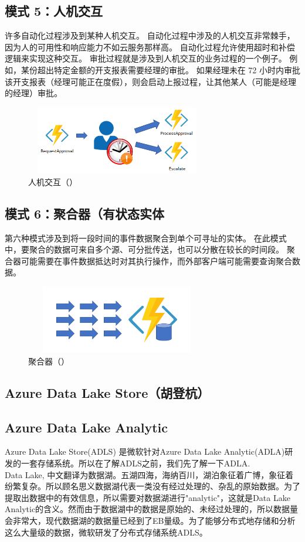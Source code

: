 \documentclass[11pt]{article}
\begin{document}
\subsection{模式 5：人机交互}
许多自动化过程涉及到某种人机交互。 自动化过程中涉及的人机交互非常棘手，因为人的可用性和响应能力不如云服务那样高。 自动化过程允许使用超时和补偿逻辑来实现这种交互。
审批过程就是涉及到人机交互的业务过程的一个例子。 例如，某份超出特定金额的开支报表需要经理的审批。 如果经理未在 72 小时内审批该开支报表（经理可能正在度假），则会启动上报过程，让其他某人（可能是经理的经理）审批。
\begin{figure}[H]
\begin{flushleft}
\includegraphics[width=8cm, height=3cm]{figs/model5}
\caption{人机交互（\cite{Durable}）}
\end{flushleft}
\end{figure}

\subsection{模式 6：聚合器（有状态实体}
第六种模式涉及到将一段时间的事件数据聚合到单个可寻址的实体。 在此模式中，要聚合的数据可来自多个源、可分批传送，也可以分散在较长的时间段。 聚合器可能需要在事件数据抵达时对其执行操作，而外部客户端可能需要查询聚合数据。
\begin{figure}[H]
\begin{flushleft}
\includegraphics[width=8cm, height=3cm]{figs/model6}
\caption{聚合器（\cite{Durable}）}
\end{flushleft}
\end{figure}

\subsection{Azure Data Lake Store（胡登杭）\cite{ramakrishnan2017azure}}
\subsection{Azure Data Lake Analytic}
Azure Data Lake Store(ADLS) 是微软针对Azure Data Lake Analytic(ADLA)研发的一套存储系统。所以在了解ADLS之前，我们先了解一下ADLA.\\
Data Lake, 中文翻译为数据湖。五湖四海，海纳百川，湖泊象征着广博，象征着纷繁复杂。所以顾名思义数据湖代表一类没有经过处理的、杂乱的原始数据。为了提取出数据中的有效信息，所以需要对数据湖进行"analytic"，这就是Data Lake Analytic的含义。然而由于数据湖中的数据是原始的、未经过处理的，所以数据量会非常大，现代数据湖的数据量已经到了EB量级。为了能够分布式地存储和分析这么大量级的数据，微软研发了分布式存储系统ADLS。
\end{document}
